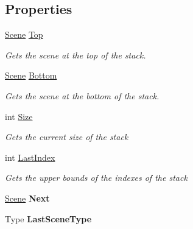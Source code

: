 \subsection*{Properties}
\begin{DoxyCompactItemize}
\item 
\hyperlink{class_m_b2_d_1_1_scenes_1_1_scene}{Scene} \hyperlink{class_m_b2_d_1_1_scenes_1_1_scene_stack_ad409d4fad58a067955ee1f6ed88229ef}{Top}
\begin{DoxyCompactList}\small\item\em Gets the scene at the top of the stack. \end{DoxyCompactList}\item 
\hyperlink{class_m_b2_d_1_1_scenes_1_1_scene}{Scene} \hyperlink{class_m_b2_d_1_1_scenes_1_1_scene_stack_a916ab93964a454fa69697bef787c79d6}{Bottom}
\begin{DoxyCompactList}\small\item\em Gets the scene at the bottom of the stack. \end{DoxyCompactList}\item 
int \hyperlink{class_m_b2_d_1_1_scenes_1_1_scene_stack_a960aea6084b685c9cb4fce6b1a586009}{Size}
\begin{DoxyCompactList}\small\item\em Gets the current size of the stack \end{DoxyCompactList}\item 
int \hyperlink{class_m_b2_d_1_1_scenes_1_1_scene_stack_a4c0fa3522458fb0d64cee1a54f31d50d}{Last\+Index}
\begin{DoxyCompactList}\small\item\em Gets the upper bounds of the indexes of the stack \end{DoxyCompactList}\item 
\hypertarget{class_m_b2_d_1_1_scenes_1_1_scene_stack_a287e35dc511d160ddad89f49710c38b0}{}\label{class_m_b2_d_1_1_scenes_1_1_scene_stack_a287e35dc511d160ddad89f49710c38b0} 
\hyperlink{class_m_b2_d_1_1_scenes_1_1_scene}{Scene} {\bfseries Next}
\item 
\hypertarget{class_m_b2_d_1_1_scenes_1_1_scene_stack_a1937f6c80443c9486b0afe5a8826ff2b}{}\label{class_m_b2_d_1_1_scenes_1_1_scene_stack_a1937f6c80443c9486b0afe5a8826ff2b} 
Type {\bfseries Last\+Scene\+Type}
\end{DoxyCompactItemize}


